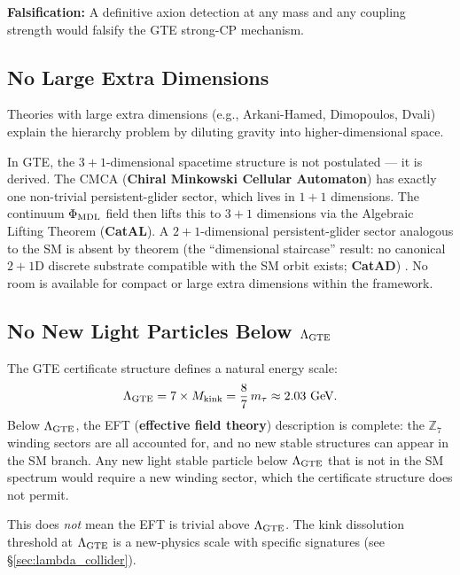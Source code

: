 \documentclass[11pt,a4paper]{article}
\newcommand{\term}[1]{\textbf{#1}}
\newcommand{\CatAL}{\textbf{CatAL}}
\newcommand{\CatAD}{\textbf{CatAD}}
\begin{document}
\textbf{Falsification:} A definitive axion detection at any mass and any
coupling strength would falsify the GTE strong-CP mechanism.

\subsection{No Large Extra Dimensions}

Theories with large extra dimensions (e.g., Arkani-Hamed, Dimopoulos, Dvali)
explain the hierarchy problem by diluting gravity into higher-dimensional space.

In GTE, the $3{+}1$-dimensional spacetime structure is not postulated — it is
derived.  The CMCA (\term{Chiral Minkowski Cellular Automaton}) has exactly one
non-trivial persistent-glider sector, which lives in $1{+}1$ dimensions.
The continuum $\Phi_{\rm MDL}$ field then lifts this to $3{+}1$ dimensions via
the Algebraic Lifting Theorem (\CatAL).  A $2{+}1$-dimensional persistent-glider
sector analogous to the SM is absent by theorem (the ``dimensional staircase''
result: no canonical $2{+}1$D discrete substrate compatible with the SM orbit
exists; \CatAD) \cite{SpivackGTECompleteFramework}.  No room is available for
compact or large extra dimensions within the framework.

\subsection[No New Light Particles Below Lambda-GTE]{No New Light Particles Below $\Lambda_{\rm GTE}$}

The GTE certificate structure defines a natural energy scale:
\begin{equation}
  \Lambda_{\rm GTE} = 7 \times M_{\rm kink} = \frac{8}{7}\,m_\tau
  \approx 2.03~\text{GeV}.
  \label{eq:lambda}
\end{equation}
Below $\Lambda_{\rm GTE}$, the EFT (\term{effective field theory}) description
is complete: the $\mathbb{Z}_7$ winding sectors are all accounted for, and no
new stable structures can appear in the SM branch.  Any new light stable particle
below $\Lambda_{\rm GTE}$ that is not in the SM spectrum would require a new
winding sector, which the certificate structure does not permit.

This does \emph{not} mean the EFT is trivial above $\Lambda_{\rm GTE}$.  The
kink dissolution threshold at $\Lambda_{\rm GTE}$ is a new-physics scale with
specific signatures (see \S\ref{sec:lambda_collider}).
\end{document}
